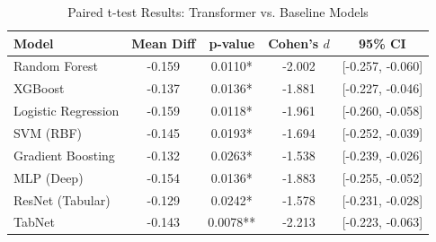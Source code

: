 \begin{table}[htbp]
\centering
\caption{Paired t-test Results: Transformer vs. Baseline Models}
\label{tab:statistical_tests}
\begin{tabular}{lcccc}
\toprule
Model & Mean Diff & p-value & Cohen's $d$ & 95\% CI \\
\midrule
Random Forest & -0.159 & 0.0110* & -2.002 & [-0.257, -0.060] \\
XGBoost & -0.137 & 0.0136* & -1.881 & [-0.227, -0.046] \\
Logistic Regression & -0.159 & 0.0118* & -1.961 & [-0.260, -0.058] \\
SVM (RBF) & -0.145 & 0.0193* & -1.694 & [-0.252, -0.039] \\
Gradient Boosting & -0.132 & 0.0263* & -1.538 & [-0.239, -0.026] \\
MLP (Deep) & -0.154 & 0.0136* & -1.883 & [-0.255, -0.052] \\
ResNet (Tabular) & -0.129 & 0.0242* & -1.578 & [-0.231, -0.028] \\
TabNet & -0.143 & 0.0078** & -2.213 & [-0.223, -0.063] \\
\bottomrule
\end{tabular}
\end{table}